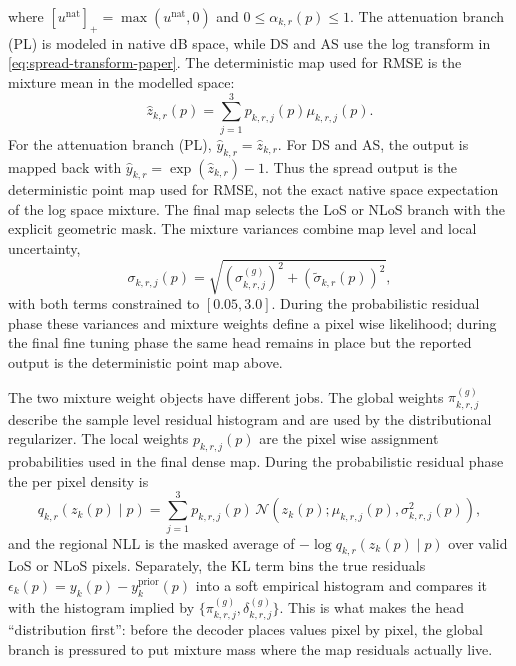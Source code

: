 \documentclass[journal]{IEEEtran}
\begin{document}
where \([u^{\mathrm{nat}}]_+=\max(u^{\mathrm{nat}},0)\) and
\(0\leq\alpha_{k,r}(p)\leq1\). The attenuation branch (PL) is modeled in native dB space, while DS and
AS use the log transform in \eqref{eq:spread-transform-paper}. The
deterministic map used for RMSE is the mixture mean in the modelled space:
\begin{equation}
\hat z_{k,r}(p)
=\sum_{j=1}^3p_{k,r,j}(p)\mu_{k,r,j}(p).
\label{eq:gmm-expectation-paper}
\end{equation}
For the attenuation branch (PL), \(\hat y_{k,r}=\hat z_{k,r}\). For DS and AS, the output is mapped
back with \(\hat y_{k,r}=\exp(\hat z_{k,r})-1\). Thus the spread output is
the deterministic point map used for RMSE, not the exact native space
expectation of the log space mixture.
The final map selects the LoS or NLoS branch with the explicit geometric mask.
The mixture variances combine map level and local uncertainty,
\begin{equation}
\sigma_{k,r,j}(p)
=
\sqrt{
\left(\sigma^{(g)}_{k,r,j}\right)^2
+
\left(\tilde\sigma_{k,r}(p)\right)^2
},
\label{eq:sigma-paper}
\end{equation}
with both terms constrained to \([0.05,3.0]\). During the probabilistic residual phase
these variances and mixture weights define a pixel wise likelihood; during the
final fine tuning phase the same head remains in place but the reported output
is the deterministic point map above.

The two mixture weight objects have different jobs. The global weights
\(\pi^{(g)}_{k,r,j}\) describe the sample level residual histogram and are
used by the distributional regularizer. The local weights \(p_{k,r,j}(p)\)
are the pixel wise assignment probabilities used in the final dense map. During
the probabilistic residual phase the per pixel density is
\begin{equation}
q_{k,r}(z_k(p)\mid p)
=
\sum_{j=1}^{3}
p_{k,r,j}(p)\,
\mathcal{N}\!\left(
z_k(p);\mu_{k,r,j}(p),\sigma^2_{k,r,j}(p)
\right),
\label{eq:gmm-density-paper}
\end{equation}
and the regional NLL is the masked average of
\(-\log q_{k,r}(z_k(p)\mid p)\) over valid LoS or NLoS pixels. Separately,
the KL term bins the true residuals
\(\epsilon_k(p)=y_k(p)-y^{\mathrm{prior}}_k(p)\) into a soft empirical
histogram and compares it with the histogram implied by
\(\{\pi^{(g)}_{k,r,j},\delta^{(g)}_{k,r,j}\}\). This is what makes the head
``distribution first'': before the decoder places values pixel by pixel, the
global branch is pressured to put mixture mass where the map residuals actually
live.
\end{document}
